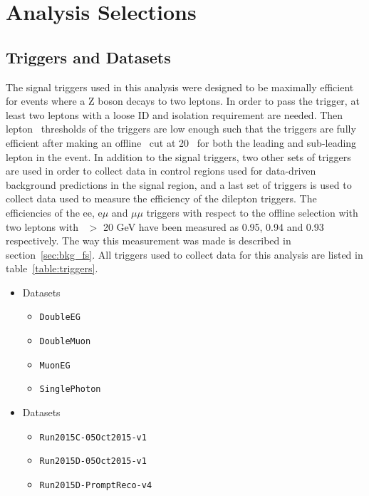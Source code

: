 \chapter{Analysis Selections}
\label{ch:evtsel}

\section{Triggers and Datasets}
The signal triggers used in this analysis were designed to be maximally efficient for events where a Z boson decays to two leptons.
In order to pass the trigger, at least two leptons with a loose ID and isolation requirement are needed.
Then lepton \pt\ thresholds of the triggers are low enough such that the triggers are fully efficient after making an offline \pt\ cut at 20 \gev\ for both the leading and sub-leading lepton in the event.
In addition to the signal triggers, two other sets of triggers are used in order to collect data in control regions used for data-driven background predictions in the signal region,
and a last set of triggers is used to collect data used to measure the efficiency of the dilepton triggers.
The efficiencies of the ee, e$\mu$ and $\mu\mu$ triggers with respect to the offline selection with two leptons with \pt\ $>$ 20 GeV have been measured as 0.95, 0.94 and 0.93 respectively.
The way this measurement was made is described in section~\ref{sec:bkg_fs}.
All triggers used to collect data for this analysis are listed in table~\ref{table:triggers}.

\begin{itemize}
\item Datasets
  \begin{itemize}
  \item \verb=DoubleEG=
  \item \verb=DoubleMuon=
  \item \verb=MuonEG=
  \item \verb=SinglePhoton=
  \end{itemize}
\item Datasets
  \begin{itemize}
  \item \verb=Run2015C-05Oct2015-v1=
  \item \verb=Run2015D-05Oct2015-v1=
  \item \verb=Run2015D-PromptReco-v4=
  \end{itemize}
\end{itemize}

